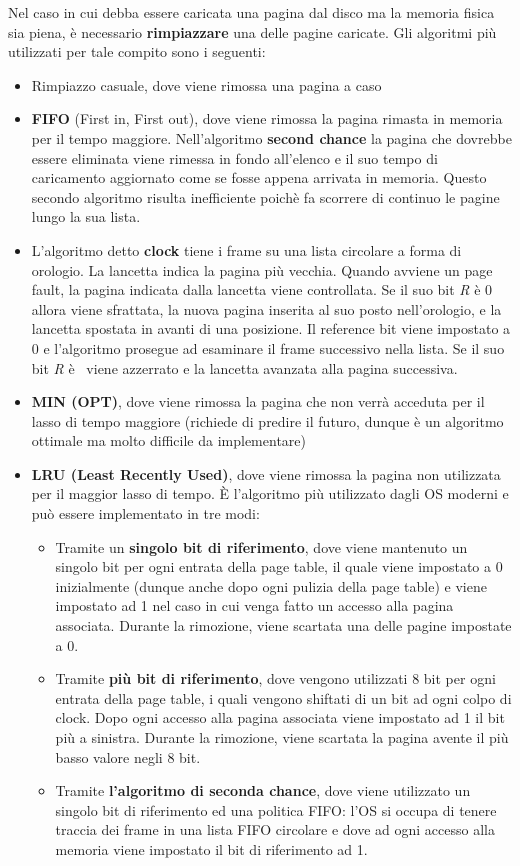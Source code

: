 \documentclass{article}
\begin{document}
Nel caso in cui debba essere caricata una pagina dal disco ma la memoria fisica sia piena, è necessario \textbf{rimpiazzare} una delle pagine caricate. Gli algoritmi più utilizzati per tale compito sono i seguenti:
\begin{itemize}
    \item Rimpiazzo casuale, dove viene rimossa una pagina a caso
    \item \textbf{FIFO} (First in, First out), dove viene rimossa la pagina rimasta in memoria per
    il tempo maggiore. Nell'algoritmo \textbf{second chance} la pagina che dovrebbe essere eliminata viene rimessa in fondo all'elenco e il suo tempo di caricamento aggiornato come se fosse appena arrivata in memoria. Questo secondo algoritmo risulta inefficiente poichè fa scorrere di continuo le pagine lungo la sua lista.
    \item L'algoritmo detto \textbf{clock} tiene i frame su una lista circolare a forma di orologio. La lancetta indica la pagina più vecchia. Quando avviene un page fault, la pagina indicata dalla lancetta viene controllata. Se il suo bit \textit{R} è 0 allora viene sfrattata, la nuova pagina inserita al suo posto nell'orologio, e la lancetta spostata in avanti di una posizione. Il reference bit viene impostato a 0 e l'algoritmo prosegue ad esaminare il frame successivo nella lista. Se il suo bit \textit{R} è \ viene azzerrato e la lancetta avanzata alla pagina successiva. 
    \item \textbf{MIN (OPT)}, dove viene rimossa la pagina che non verrà acceduta per il lasso di tempo maggiore (richiede di predire il futuro, dunque è un algoritmo ottimale ma molto difficile da implementare)
    \item \textbf{LRU (Least Recently Used)}, dove viene rimossa la pagina non utilizzata per il maggior lasso di tempo. È l'algoritmo più utilizzato dagli OS moderni e può essere implementato in tre modi:
    \begin{itemize}
        \item Tramite un \textbf{singolo bit di riferimento}, dove viene mantenuto un singolo bit per ogni entrata della page table, il quale viene impostato a 0 inizialmente (dunque anche dopo ogni pulizia della page table) e viene impostato ad 1 nel caso in cui venga fatto un accesso alla pagina associata.
        Durante la rimozione, viene scartata una delle pagine impostate a 0.
        \item Tramite \textbf{più bit di riferimento}, dove vengono utilizzati 8 bit per ogni entrata della page table, i quali vengono shiftati di un bit ad ogni colpo di clock. Dopo ogni accesso alla pagina associata viene impostato ad 1 il bit più a sinistra.
        Durante la rimozione, viene scartata la pagina avente il più basso valore negli 8 bit.
        \item Tramite \textbf{l'algoritmo di seconda chance}, dove viene utilizzato un singolo bit di riferimento ed una politica FIFO: l'OS si occupa di tenere traccia dei frame in una lista FIFO circolare e dove ad ogni accesso alla memoria viene impostato il bit di riferimento ad 1.\par


\end{itemize}
\end{itemize}
\end{document}
